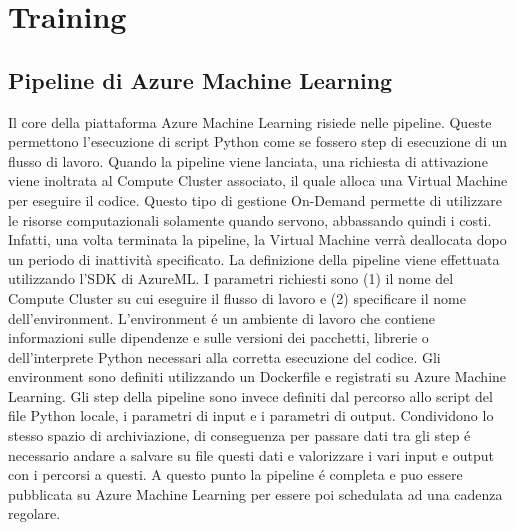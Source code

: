 \section{Training}
\subsection{Pipeline di Azure Machine Learning}
Il core della piattaforma Azure Machine Learning risiede nelle pipeline. Queste permettono l'esecuzione di script Python come se fossero step di esecuzione di un flusso di lavoro. Quando la pipeline viene lanciata, una richiesta di attivazione viene inoltrata al Compute Cluster associato, il quale alloca una Virtual Machine per eseguire il codice. Questo tipo di gestione On-Demand permette di utilizzare le risorse computazionali solamente quando servono, abbassando quindi i costi. Infatti, una volta terminata la pipeline, la Virtual Machine verrà deallocata dopo un periodo di inattività specificato.
La definizione della pipeline viene effettuata utilizzando l'SDK di AzureML. 
I parametri richiesti sono (1) il nome del Compute Cluster su cui eseguire il flusso di lavoro e (2) specificare il nome dell'environment. L'environment é un ambiente di lavoro che contiene informazioni sulle dipendenze e sulle versioni dei pacchetti, librerie o dell'interprete Python necessari alla corretta esecuzione del codice. Gli environment sono definiti utilizzando un Dockerfile e registrati su Azure Machine Learning.
Gli step della pipeline sono invece definiti dal percorso allo script del file Python locale, i parametri di input e i parametri di output. Condividono lo stesso spazio di archiviazione, di conseguenza per passare dati tra gli step é necessario andare a salvare su file questi dati e valorizzare i vari input e output con i percorsi a questi.
A questo punto la pipeline é completa e puo essere pubblicata su Azure Machine Learning per essere poi schedulata ad una cadenza regolare.

